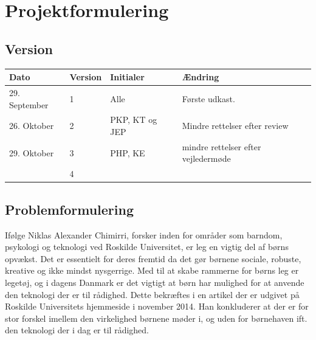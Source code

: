 \chapter{Projektformulering} \label{ch:projektformulering}
\section*{Version}
\begin{table}[h]
	\centering
	\begin{tabularx}{\textwidth - 2cm}{|l|l|l|X|}
	\hline
	Dato			& Version			& Initialer 		& Ændring										\\ \hline
	29. September 	& 1 				& Alle				& Første udkast. 								\\ \hline
	26. Oktober		& 2 				& PKP, KT og JEP	& Mindre rettelser efter review					\\ \hline
	29.	Oktober		& 3 				& PHP, KE 			& mindre rettelser efter vejledermøde			\\ \hline
					& 4 				&  					& 												\\ \hline
	\end{tabularx}
\end{table}
\clearpage

\section{Problemformulering} \label{sec:problemformulering}
Ifølge Niklas Alexander Chimirri, forsker inden for områder som barndom, psykologi og teknologi ved Roskilde Universitet, er leg en vigtig del af børns opvækst.   
Det er essentielt for deres fremtid da det gør børnene sociale, robuste, kreative og ikke mindst nysgerrige. Med til at skabe rammerne for børns leg er legetøj, og i dagens Danmark er det vigtigt at børn har mulighed for at anvende den teknologi der er til rådighed. 
Dette bekræftes i en artikel der er udgivet på Roskilde Universitets hjemmeside i november 2014.
Han konkluderer at der er for stor forskel imellem den virkelighed børnene møder i, og uden for børnehaven ift. den teknologi der i dag er til rådighed. 



